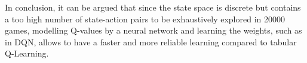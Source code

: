 \documentclass[10pt]{IEEEtran}
\begin{document}
In conclusion, it can be argued that since the state space is discrete but contains a too high number of state-action pairs to be exhaustively explored in 20000 games, modelling Q-values by a neural network and learning the weights, such as in DQN, allows to have a faster and more reliable learning compared to tabular Q-Learning.

\nocite{*}
\printbibliography

\end{document}
